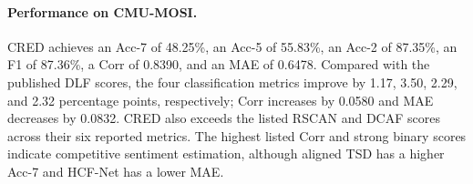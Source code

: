 \documentclass[review,12pt]{elsarticle}
\begin{document}
\begin{table}[t]
\centering
\caption{Performance comparison on CMU-MOSEI. Accuracies and F1 are percentages. $\dagger$: values quoted from DLF Table~1 \cite{dlf}; other baseline scores come from their own papers. Dashes indicate unreported or excluded metrics. Bold denotes the best listed value under the respective reported settings. CRED results are from a single run.}
\label{tab:results}
\end{table}

\paragraph{Performance on CMU-MOSI.}
CRED achieves an Acc-7 of 48.25\%, an Acc-5 of 55.83\%, an Acc-2 of 87.35\%, an F1 of 87.36\%, a Corr of 0.8390, and an MAE of 0.6478. Compared with the published DLF scores, the four classification metrics improve by 1.17, 3.50, 2.29, and 2.32 percentage points, respectively; Corr increases by 0.0580 and MAE decreases by 0.0832. CRED also exceeds the listed RSCAN and DCAF scores across their six reported metrics. The highest listed Corr and strong binary scores indicate competitive sentiment estimation, although aligned TSD has a higher Acc-7 and HCF-Net has a lower MAE.
\end{document}
